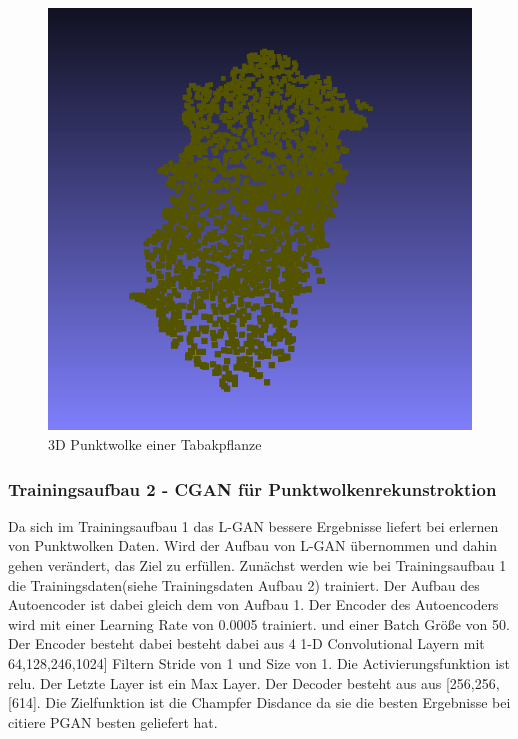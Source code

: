 \documentclass{llncs}
\begin{document}
\begin{figure}[htbp] 
	\centering
	\includegraphics[width=1.2\textwidth]{leaf1.png}
	\caption{3D Punktwolke einer Tabakpflanze}
	\label{fig:Bild2}
\end{figure}

\subsubsection{Trainingsaufbau 2 - CGAN für Punktwolkenrekunstroktion }

Da sich im Trainingsaufbau 1 das L-GAN bessere Ergebnisse liefert bei erlernen von Punktwolken Daten. Wird der Aufbau von L-GAN übernommen und dahin gehen verändert, das Ziel zu erfüllen. Zunächst werden wie bei Trainingsaufbau 1 die Trainingsdaten(siehe Trainingsdaten Aufbau 2) trainiert. Der Aufbau des Autoencoder ist dabei gleich dem von Aufbau 1. Der Encoder des Autoencoders wird mit einer Learning Rate von 0.0005 trainiert. und einer Batch Größe von 50. Der Encoder besteht dabei besteht dabei aus 4 1-D Convolutional Layern mit 64,128,246,1024] Filtern Stride von 1 und Size von 1. Die Activierungsfunktion ist relu. Der Letzte Layer ist ein Max Layer. Der Decoder besteht aus aus [256,256,[614]. Die Zielfunktion ist die Champfer Disdance  da sie die besten Ergebnisse bei citiere PGAN besten geliefert hat.\\
\end{document}
